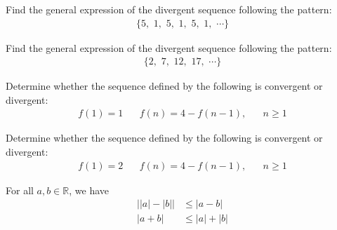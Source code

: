 \begin{exercise}
Find the general expression of the divergent sequence following the pattern:
\begin{align*}
    \{5, \hspace{4pt} 1, \hspace{4pt} 5, \hspace{4pt} 1, \hspace{4pt} 5, \hspace{4pt} 1, \hspace{4pt} \cdots\}
\end{align*}
\end{exercise}

\begin{exercise}
Find the general expression of the divergent sequence following the pattern:
\begin{align*}
    \{2, \hspace{4pt} 7, \hspace{4pt} 12, \hspace{4pt} 17, \hspace{4pt} \cdots\}
\end{align*}
\end{exercise}

\begin{exercise}
Determine whether the sequence defined by the following is convergent or divergent:
\begin{align*}
    f(1) = 1 \hspace{20pt} f(n) = 4 - f(n-1), \hspace{20pt} n \geq 1
\end{align*}
\end{exercise}

\begin{exercise}
Determine whether the sequence defined by the following is convergent or divergent:
\begin{align*}
    f(1) = 2 \hspace{20pt} f(n) = 4 - f(n-1), \hspace{20pt} n \geq 1
\end{align*}
\end{exercise}

\begin{recall}
For all $a, b \in \mathbb{R}$, we have
\begin{align*}
    \Big\lvert \lvert a \rvert - \lvert b \rvert \Big\rvert &\leq \lvert a - b \rvert \\[2ex]
    \lvert a + b \rvert &\leq \lvert a \rvert + \lvert b \rvert
\end{align*}
\label{triangle_inequality}
\end{recall}

